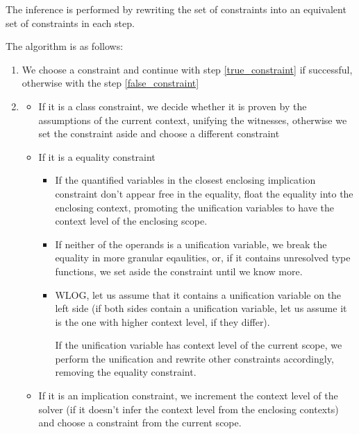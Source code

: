 \begin{defn}
    The inference is performed by rewriting the set of constraints into an equivalent set of constraints in each step.
    
    The algorithm is as follows:

    \begin{enumerate}
        \item We choose a constraint and continue with step \ref{true_constraint} if successful, otherwise with the step \ref{false_constraint} \label{choose_constraint}
        \item \label{true_constraint}
        \begin{itemize}
            \item If it is a class constraint, we decide whether it is proven by the assumptions of the current context, unifying the witnesses, otherwise we set the constraint aside and choose a different constraint
            \item If it is a equality constraint
                \begin{itemize}
                    \item If the quantified variables in the closest enclosing implication constraint don't appear free in the equality, float the equality into the enclosing context, promoting the unification variables to have the context level of the enclosing scope.
                        
                    \item If neither of the operands is a unification variable, we break the equality in more granular eqaulities, or, if it contains unresolved type functions, we set aside the constraint until we know more.
                    
                    \item WLOG, let us assume that it contains a unification variable on the left side (if both sides contain a unification variable, let us assume it is the one with higher context level, if they differ).
                        
                    
                    If the unification variable has context level of the current scope, we perform the unification and rewrite other constraints accordingly, removing the equality constraint.

                \end{itemize}

            \item If it is an implication constraint, we increment the context level of the solver (if it doesn't infer the context level from the enclosing contexts) and choose a constraint from the current scope.
            

\end{itemize}
\end{enumerate}
\end{defn}

